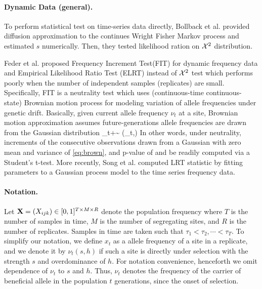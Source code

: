 \documentclass[11pt]{article}
\begin{document}
\paragraph{Dynamic Data (general).} 
To perform statistical test on time-series data directly, Bollback et al. \cite{bollback2008estimation} provided diffusion approximation to the continues Wright Fisher Markov process and estimated $s$ numerically. Then, they tested likelihood ration on ${\cal X}^2$ distribution.

Feder et al. \cite{feder2014Identifying} proposed Frequency Increment
Test(FIT) for dynamic frequency data and Empirical Likelihood Ratio Test (ELRT) instead of ${\cal X}^2$ test which performs poorly when the number of independent samples (replicates) are small.
Specifically, FIT is a neutrality test which uses (continuous-time 
continuous-state) Brownian motion process for modeling variation of 
 allele frequencies under genetic drift. 
 Basically, given current allele frequency 
 $\nu_t$ at a site, Brownian motion approximation assumes 
 future-generations allele 
 frequencies are drawn from the Gaussian distribution
 \beq
 \nu_{t+\tau}\sim 
 \Nc\left(\nu_t,\tau\right) 
 \label{eq:brown}
 \eeq
 In other words, under neutrality, increments of the consecutive observations 
 drawn from a Gaussian with 
 zero mean and variance of \eqref{eq:brown}, and p-value of and be readily 
 computed via a Student's t-test. More recently, Song et al. 
 \cite{Terhorst2015Multi} computed LRT statistic by fitting 
 parameters to a Gaussian process model to the time series frequency data. 


\paragraph{Notation.} Let ${\mathbf X} = (X_{ijk}) \in [0, 1]^{T \times 
M\times R}$ denote the population frequency where $T$ is the number of samples 
in time, $M$ is the number of segregating sites, and $R$ is the number of 
replicates. Samples in time are taken such that $\tau_1<\tau_2,\cdots<\tau_T$.
To simplify our notation, we define $x_t$ as a allele frequency of a site in a
 replicate, and we denote it by $\nu_t(s,h)$ if such a site is directly 
 under 
 selection with the strength $s$ and overdominance of $h$. For 
 notation 
 convenience, henceforth we omit dependence of $\nu_t$ to $s$ and 
 $h$. 
 Thus, $\nu_t$ denotes the frequency of 
 the carrier of beneficial allele in the population $t$ generations, since the 
 onset of selection.
\end{document}
